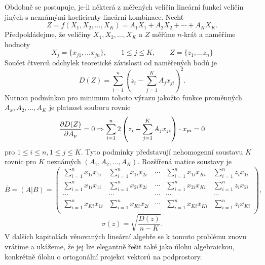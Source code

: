       Obdobně se postupuje, je-li některá z měřených veličin lineární funkcí veličin jiných s 
      neznámými koeficienty lineární kombinace. Nechť
      \begin{equation*}
        Z = f(X_1, X_2, \ldots, X_K) = A_1X_1 + A_2X_2 + \cdots + A_KX_K.
      \end{equation*}
      Předpokládejme, že veličiny \(X_1, X_2, \ldots, X_K\) a \(Z\) měříme \(n\)-krát a naměříme 
      hodnoty
      \begin{equation*}
        X_j = \lbrace x_{j1}, \ldots x_{jn} \rbrace, \qquad 1 \leq j \leq K, \qquad 
        Z = \lbrace z_{1}, \ldots z_{n} \rbrace
      \end{equation*}
      Součet čtverců odchylek teoretické závislosti od naměřených bodů je
      \begin{equation*}
        D(Z) = \sum_{i=1}^{n}\left(z_i - \sum_{j=1}^{K}A_jx_{ji}\right)^2.
      \end{equation*}
      Nutnou podmínkou pro minimum tohoto výrazu jakožto funkce proměnných \(A_x, A_2, \ldots, A_K\)
      je platnost souboru rovnic
      \begin{equation*}
        \dfrac{\partial D(Z)}{\partial A_p} = 0 \Rightarrow 
        \sum_{i=1}^{n}2\left(z_i - \sum_{j=1}^{K}A_jx_{ji}\right)\cdot x_{pi} = 0
      \end{equation*}
      pro \(1 \leq i \leq n, 1 \leq j \leq K\). Tyto podmínky představují nehomogenní soustavu 
      \(K\) rovnic pro \(K\) neznámých \(( A_1, A_2, \ldots, A_K)\). Rozšířená matice soustavy je
      \begin{equation*}
        \overline{B} = (A|B) = 
          \left(
            \begin{array}{cccc|c}
              \sum_{i=1}^{n}x_{1i}x_{1i} & \sum_{i=1}^{n}x_{1i}x_{2i} & \cdots & 
              \sum_{i=1}^{n}x_{1i}x_{Ki} & \sum_{i=1}^{n}z_{i}x_{1i}                    \\
              \sum_{i=1}^{n}x_{1i}x_{1i} & \sum_{i=1}^{n}x_{2i}x_{2i} & \cdots & 
              \sum_{i=1}^{n}x_{2i}x_{Ki} & \sum_{i=1}^{n}z_{i}x_{2i}                    \\
                        \cdots           & \cdots & \cdots & \cdots   & \cdots          \\
              \sum_{i=1}^{n}x_{Ki}x_{1i} & \sum_{i=1}^{n}x_{Ki}x_{2i} & \cdots & 
              \sum_{i=1}^{n}x_{Ki}x_{Ki} & \sum_{i=1}^{n}z_{i}x_{Ki}                    \\
            \end{array}
          \right),
      \end{equation*}
      \begin{equation*}
        \sigma(z) = \sqrt{\dfrac{D(z)}{n - K}}.
      \end{equation*}
      V dalších kapitolách věnovaných lineární algebře se k tomuto problému znovu vrátíme a 
      ukážeme, že jej lze elegantně řešit také jako úlohu algebraickou, konkrétně úlohu o 
      ortogonální projekci vektorů na podprostory.
      
\printbibliography[heading=subbibliography]
